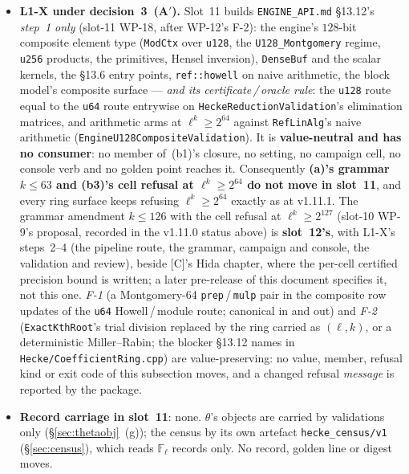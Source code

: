 \documentclass[11pt]{article}
\theoremstyle{remark}
\newcommand{\F}{\mathbb{F}}
\newcommand{\Fl}{\F_\ell}
\begin{document}
\begin{itemize}
  \texttt{Integral/Model/StrictLift} for $\mathrm{diag}(1,p^2)$ and $\mathrm{diag}(p,p)$ (explicit
  \texttt{ModCtx}, no setting read); and slot-11 WP-18's $128$-bit element type (next item).
\item \textbf{L1-X under decision~3~(A$'$).} Slot~11 builds \texttt{ENGINE\_API.md} \S13.12's
  \emph{step~1 only} (slot-11 WP-18, after WP-12's F-2): the engine's $128$-bit composite element
  type (\texttt{ModCtx} over \texttt{u128}, the \texttt{U128\_Montgomery} regime, \texttt{u256}
  products, the primitives, Hensel inversion), \texttt{DenseBuf} and the scalar kernels, the
  \S13.6 entry points, \texttt{ref::howell} on naive arithmetic, the block model's composite
  surface --- \emph{and its certificate\,/\,oracle rule}: the \texttt{u128} route equal to the
  \texttt{u64} route entrywise on \texttt{HeckeReductionValidation}'s elimination matrices, and
  arithmetic arms at $\ell^k\ge2^{64}$ against \texttt{RefLinAlg}'s naive arithmetic
  (\texttt{EngineU128CompositeValidation}). It is \textbf{value-neutral and has no consumer}: no
  member of~(b1)'s closure, no setting, no campaign cell, no console verb and no golden point
  reaches it. Consequently \textbf{(a)'s grammar $k\le63$ and (b3)'s cell refusal at
  $\ell^k\ge2^{64}$ do not move in slot~11}, and every ring surface keeps refusing $\ell^k\ge2^{64}$
  exactly as at v1.11.1. The grammar amendment $k\le126$ with the cell refusal at
  $\ell^k\ge2^{127}$ (slot-10 WP-9's proposal, recorded in the v1.11.0 status above) is
  \textbf{slot~12's}, with L1-X's steps~2--4 (the pipeline route, the grammar, campaign and
  console, the validation and review), beside [C]'s Hida chapter, where the per-cell certified
  precision bound is written; a later pre-release of this document specifies it, not this one.
  \emph{F-1} (a Montgomery-64 \texttt{prep}\,/\,\texttt{mulp} pair in the composite row updates of
  the \texttt{u64} Howell\,/\,module route; canonical in and out) and \emph{F-2}
  (\texttt{ExactKthRoot}'s trial division replaced by the ring carried as $(\ell,k)$, or a
  deterministic Miller--Rabin; the blocker \S13.12 names in \texttt{Hecke/CoefficientRing.cpp})
  are value-preserving: no value, member, refusal kind or exit code of this subsection moves, and
  a changed refusal \emph{message} is reported by the package.
\item \textbf{Record carriage in slot~11}: none. $\theta$'s objects are carried by validations
  only (\S\ref{sec:thetaobj}~(g)); the census by its own artefact \texttt{hecke\_census/v1}
  (\S\ref{sec:census}), which reads $\Fl$ records only. No record, golden line or digest moves.
\end{itemize}
\end{document}

